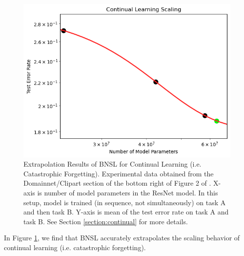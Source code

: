 \documentclass{article} %
\begin{document}
\begin{figure}[htbp]
    \centering
\includegraphics[width=1.0\textwidth]{figures/continual_learning/continual_vision.png}

    \caption{
Extrapolation Results of BNSL for Continual Learning (i.e. Catastrophic Forgetting). Experimental data obtained from the Domainnet/Clipart section of the bottom right of Figure 2 of \citep{ramasesh2022effect}. X-axis is number of model parameters in the ResNet model. In this setup, model is trained (in sequence, not simultaneously) on task A and then task B. Y-axis is mean of the test error rate on task A and task B. See Section \ref{section:continual} for more details.
    }
    \label{fig:continual}
\end{figure}

In Figure \ref{fig:continual}, we find that BNSL accurately extrapolates the scaling behavior of continual learning (i.e. catastrophic forgetting).

\clearpage
\end{document}
